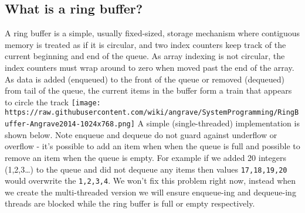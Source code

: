 \subsection{What is a ring buffer?}\label{what-is-a-ring-buffer}

A ring buffer is a simple, usually fixed-sized, storage mechanism where
contiguous memory is treated as if it is circular, and two index
counters keep track of the current beginning and end of the queue. As
array indexing is not circular, the index counters must wrap around to
zero when moved past the end of the array. As data is added (enqueued)
to the front of the queue or removed (dequeued) from tail of the queue,
the current items in the buffer form a train that appears to circle the
track
\texttt{[image: https://raw.githubusercontent.com/wiki/angrave/SystemProgramming/RingBuffer-Angrave2014-1024x768.png]}
A simple (single-threaded) implementation is shown below. Note enqueue
and dequeue do not guard against underflow or overflow - it's possible
to add an item when when the queue is full and possible to remove an
item when the queue is empty. For example if we added 20 integers
(1,2,3\ldots{}) to the queue and did not dequeue any items then values
\texttt{17,18,19,20} would overwrite the \texttt{1,2,3,4}. We won't fix
this problem right now, instead when we create the multi-threaded
version we will ensure enqueue-ing and dequeue-ing threads are blocked
while the ring buffer is full or empty respectively.

\begin{Shaded}
\begin{Highlighting}[]
 \NormalTok{*buffer[}\NormalTok{];}
 \NormalTok{;}

  
   \NormalTok{; }
\NormalTok{\}}

 
   
   \NormalTok{;}
   
\NormalTok{\}}
\end{Highlighting}
\end{Shaded}

